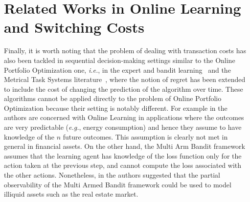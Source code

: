 \section{Related Works in Online Learning and Switching Costs}
Finally, it is worth noting that the problem of dealing with transaction costs has also been tackled in sequential decision-making settings similar to the Online Portfolio Optimization one, \emph{i.e.}, in the expert and bandit learning~\cite{li2018online,cesa2013online,trovo2016budgeted} and the Metrical Task Systems literature~\cite{lin2012online}, where the notion of regret has been extended to include the cost of changing the prediction of the algorithm over time. These algorithms cannot be applied directly to the problem of Online Portfolio Optimization because their setting is notably different. 
For example in \cite{li2018online} the authors are concerned with Online Learning in applications where the outcomes are very predictable (\emph{e.g.}, energy consumption) and hence they assume to have knowledge of the $n$ future outcomes. This assumption is clearly not met in general in financial assets.
On the other hand, the Multi Arm Bandit framework assumes that the learning agent has knowledge of the loss function only for the action taken at the previous step, and cannot compute the loss associated with the other actions. Nonetheless, in \cite{ito2018regret} the authors suggested that the partial observability of the Multi Armed Bandit framework could be used to model illiquid assets such as the real estate market.
